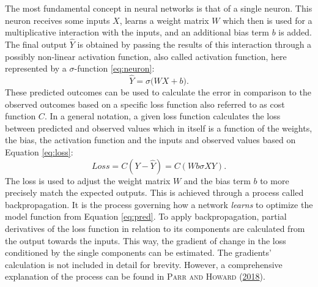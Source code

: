 \documentclass[a4paper,11pt]{article}
\begin{document}
The most fundamental concept in neural networks is that of a single neuron. This neuron
receives some inputs \(X\), learns a weight matrix \(W\) which then is used for a
multiplicative interaction with the inputs, and an additional bias term \(b\) is added.
The final output \(\hat{Y}\) is obtained by passing the results of this interaction
through a possibly non-linear activation function, also called activation
function, here represented by a \(\sigma\)-function \eqref{eq:neuron}:
\begin{equation}
\hat{Y} = \sigma \Big(WX+b \Big).
\label{eq:neuron}
\end{equation}
These predicted outcomes can be used to calculate the error in comparison
to the observed outcomes based on a specific loss function also referred to as
cost function \(C\). In a general notation,
a given loss function calculates the loss between predicted and observed values
which in itself is a function of the weights, the bias, the activation function
and the inputs and observed values based on Equation \eqref{eq:loss}:
\begin{equation}
Loss = C(Y-\hat{Y}) = C(W b \sigma X Y).
\label{eq:loss}
\end{equation}
The loss is used to adjust the weight matrix \(W\) and the bias term \(b\) to more
precisely match the expected outputs. This is achieved through a process called
backpropagation. It is the process governing how a network \emph{learns} to optimize
the model function from Equation \eqref{eq:pred}. To apply backpropagation,
partial derivatives of the loss function in relation to its components are calculated
from the output towards the inputs. This way, the gradient of change in the loss
conditioned by the single components can be estimated. The gradients' calculation
is not included in detail for brevity. However, a comprehensive explanation of
the process can be found in \textsc{\textnormal{Parr} and \textnormal{Howard}} \textsc{(\textnormal{\protect\hyperlink{ref-parr2018}{2018}})}.

\newpage
\end{document}
